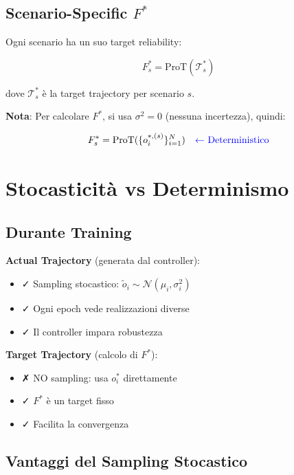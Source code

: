 \documentclass[11pt,a4paper]{article}
\begin{document}
\subsection{Scenario-Specific $F^*$}

Ogni scenario ha un suo target reliability:

\begin{equation}
F_s^* = \text{ProT}(\mathcal{T}^*_s)
\end{equation}

dove $\mathcal{T}^*_s$ è la target trajectory per scenario $s$.

\textbf{Nota}: Per calcolare $F^*$, si usa $\sigma^2 = 0$ (nessuna incertezza), quindi:

\begin{equation}
F_s^* = \text{ProT}(\{o_i^{*,(s)}\}_{i=1}^N) \quad \text{\textcolor{blue}{← Deterministico}}
\end{equation}

\section{Stocasticità vs Determinismo}

\subsection{Durante Training}

\textbf{Actual Trajectory} (generata dal controller):
\begin{itemize}
    \item ✓ Sampling stocastico: $\tilde{o}_i \sim \mathcal{N}(\mu_i, \sigma_i^2)$
    \item ✓ Ogni epoch vede realizzazioni diverse
    \item ✓ Il controller impara robustezza
\end{itemize}

\textbf{Target Trajectory} (calcolo di $F^*$):
\begin{itemize}
    \item ✗ NO sampling: usa $o_i^*$ direttamente
    \item ✓ $F^*$ è un target fisso
    \item ✓ Facilita la convergenza
\end{itemize}

\subsection{Vantaggi del Sampling Stocastico}
\end{document}
